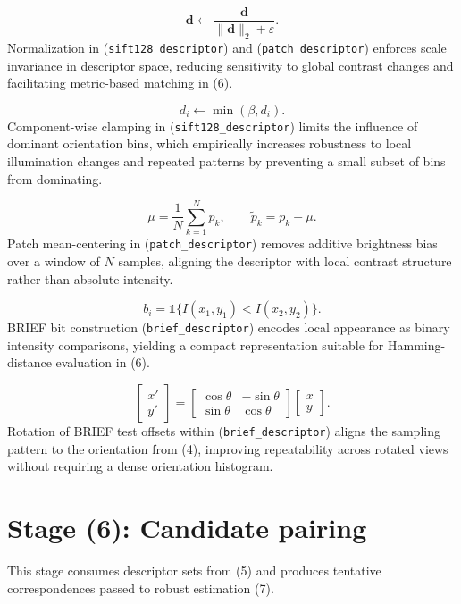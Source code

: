 \documentclass[11pt]{article}
\begin{document}
\begin{equation}
\mathbf{d}\leftarrow \frac{\mathbf{d}}{\lVert \mathbf{d}\rVert_2+\varepsilon}.
\end{equation}
Normalization in (\texttt{sift128\_descriptor}) and (\texttt{patch\_descriptor}) enforces scale invariance in descriptor space, reducing sensitivity to global contrast changes and facilitating metric-based matching in (6).

\begin{equation}
d_i \leftarrow \min(\beta, d_i).
\end{equation}
Component-wise clamping in (\texttt{sift128\_descriptor}) limits the influence of dominant orientation bins, which empirically increases robustness to local illumination changes and repeated patterns by preventing a small subset of bins from dominating.

\begin{equation}
\mu=\frac{1}{N}\sum_{k=1}^{N} p_k,\qquad \tilde p_k=p_k-\mu.
\end{equation}
Patch mean-centering in (\texttt{patch\_descriptor}) removes additive brightness bias over a window of $N$ samples, aligning the descriptor with local contrast structure rather than absolute intensity.

\begin{equation}
b_i=\mathbb{1}\{I(x_1,y_1)<I(x_2,y_2)\}.
\end{equation}
BRIEF bit construction (\texttt{brief\_descriptor}) encodes local appearance as binary intensity comparisons, yielding a compact representation suitable for Hamming-distance evaluation in (6).

\begin{equation}
\begin{bmatrix}x'\\y'\end{bmatrix}=
\begin{bmatrix}\cos\theta & -\sin\theta\\ \sin\theta & \cos\theta\end{bmatrix}
\begin{bmatrix}x\\y\end{bmatrix}.
\end{equation}
Rotation of BRIEF test offsets within (\texttt{brief\_descriptor}) aligns the sampling pattern to the orientation from (4), improving repeatability across rotated views without requiring a dense orientation histogram.

\section*{Stage (6): Candidate pairing}
This stage consumes descriptor sets from (5) and produces tentative correspondences passed to robust estimation (7).
\end{document}
